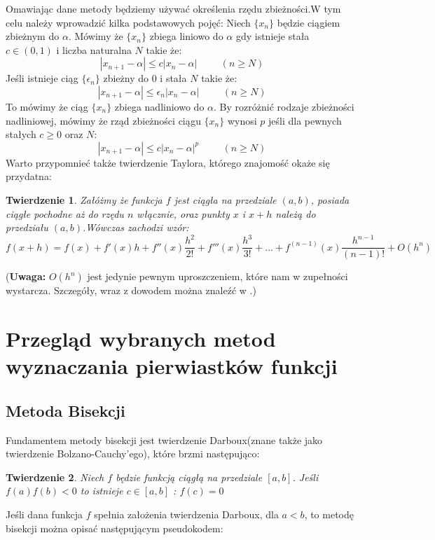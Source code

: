\documentclass[11pt,wide]{article}
\newtheorem{thr}{Twierdzenie}
\begin{document}
\noindent Omawiając dane metody będziemy używać określenia rzędu zbieżności.W tym celu należy wprowadzić kilka podstawowych pojęć:\newline
Niech $\{x_{n}\}$ będzie ciągiem zbieżnym do $\alpha$. Mówimy że $\{x_{n}\}$ zbiega liniowo do $\alpha$ gdy istnieje stała $c \in (0,1)$ i liczba naturalna $N$ takie że:
\begin{equation}
|x_{n+1} - \alpha| \le c|x_n - \alpha| \hspace{1cm} (n \ge N)
\end{equation}
Jeśli istnieje ciąg $\{\epsilon_{n}\}$ zbieżny do 0 i stała $N$ takie że:
\begin{equation}
|x_{n+1} - \alpha| \le \epsilon_{n}|x_n - \alpha| \hspace{1cm} (n \ge N)
\end{equation}
To mówimy że ciąg $\{x_n\}$ zbiega nadliniowo do $\alpha$.\newline
By rozróżnić rodzaje zbieżności nadliniowej, mówimy że rząd zbieżności ciągu $\{x_n\}$ wynosi $p$ jeśli dla pewnych stałych $c \ge 0$ oraz $N$: 
\begin{equation}
|x_{n+1} - \alpha| \le c|x_n - \alpha|^p \hspace{1cm} (n \ge N)
\end{equation}
Warto przypomnieć także twierdzenie Taylora, którego znajomość okaże się przydatna:
\begin{thr}
Załóżmy że funkcja $f$ jest ciągła na przedziale $(a,b)$, posiada ciągłe pochodne aż do rzędu $n$ włącznie, oraz punkty $x$ i $x+h$ należą do przedziału $(a,b)$.Wówczas zachodzi wzór:
\begin{equation}
f(x + h) = f(x) + f'(x)h + f''(x)\frac{h^2}{2!} + f'''(x)\frac{h^3}{3!} + ... + f^{(n-1)}(x)\frac{h^{n-1}}{(n-1)!} + O(h^n)
\end{equation}
\end{thr}
\noindent
(\textbf{Uwaga:} $O(h^n)$ jest jedynie pewnym uproszczeniem, które nam w zupełności wystarcza. Szczegóły, wraz z dowodem można znaleźć w \cite[s.162]{banach}.)




\section{Przegląd wybranych metod wyznaczania pierwiastków funkcji}
\subsection{Metoda Bisekcji}
Fundamentem metody bisekcji jest twierdzenie Darboux(znane także jako twierdzenie Bolzano-Cauchy’ego), które brzmi następująco:
\begin{thr}
Niech $f$ będzie funkcją ciągłą na przedziale $[a,b]$. Jeśli $f(a)f(b) < 0$ to istnieje $c \in [a,b]$ : $f(c) = 0$
\end{thr}
Jeśli dana funkcja $f$ spełnia założenia twierdzenia Darboux, dla $a < b$, to metodę bisekcji można opisać następującym pseudokodem:
\end{document}
